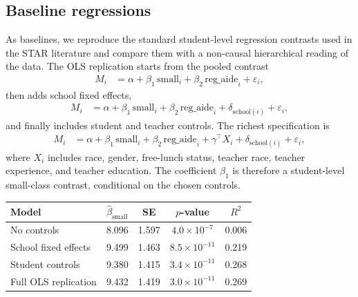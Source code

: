 \documentclass[unnumsec,webpdf,contemporary,large]{oup-authoring-template}%
\theoremstyle{thmstyleone}%
\theoremstyle{thmstyletwo}%
\theoremstyle{thmstylethree}%
\begin{document}
\subsection{Baseline regressions}

As baselines, we reproduce the standard student-level regression contrasts used in the STAR literature and compare them with a non-causal hierarchical reading of the data.
The OLS replication starts from the pooled contrast
\begin{align}
  M_i
  &=
  \alpha
  + \beta_1\,\mathrm{small}_i
  + \beta_2\,\mathrm{reg\_aide}_i
  + \varepsilon_i ,
  \label{eq:ols-pooled}
\end{align}
then adds school fixed effects,
\begin{align}
  M_i
  &=
  \alpha
  + \beta_1\,\mathrm{small}_i
  + \beta_2\,\mathrm{reg\_aide}_i
  + \delta_{\mathrm{school}(i)}
  + \varepsilon_i ,
  \label{eq:ols-school}
\end{align}
and finally includes student and teacher controls. The richest specification is
\begin{align}
  M_i
  &=
  \alpha
  + \beta_1\,\mathrm{small}_i
  + \beta_2\,\mathrm{reg\_aide}_i
  + \gamma^\top X_i
  + \delta_{\mathrm{school}(i)}
  + \varepsilon_i ,
  \label{eq:ols}
\end{align}
where $X_i$ includes race, gender, free-lunch status, teacher race, teacher experience, and teacher education.
The coefficient $\beta_1$ is therefore a student-level small-class contrast, conditional on the chosen controls.

\begin{center}
\label{tab:ols}
\begin{tabular}{lcccc}
\toprule
Model & $\hat\beta_{\mathrm{small}}$ & SE & $p$-value & $R^2$ \\
\midrule
No controls & 8.096 & 1.597 & $4.0\times 10^{-7}$ & 0.006 \\
School fixed effects & 9.499 & 1.463 & $8.5\times 10^{-11}$ & 0.219 \\
Student controls & 9.380 & 1.415 & $3.4\times 10^{-11}$ & 0.268 \\
Full OLS replication & 9.432 & 1.419 & $3.0\times 10^{-11}$ & 0.269 \\
\bottomrule
\end{tabular}
\end{center}
\end{document}
